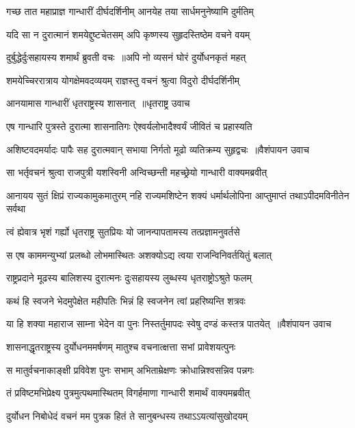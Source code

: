 \twolineshloka
{गच्छ तात महाप्राज्ञ गान्धारीं दीर्घदर्शिनीम्}
{आनयेह तया सार्धमनुनेष्यामि दुर्मतिम्}


\twolineshloka
{यदि सा न दुरात्मानं शमयेद्दुष्टचेतसम्}
{अपि कृष्णस्य सुहृदस्तिष्ठेम वचने वयम्}


\twolineshloka
{दुर्बुद्धेर्दुःसहायस्य शमार्थं ब्रुवती वचः ॥अपि नो व्यसनं घोरं दुर्योधनकृतं महत्}
{}


\threelineshloka
{शमयेच्चिररात्राय योगक्षेमवदव्ययम्}
{राज्ञस्तु वचनं श्रुत्वा विदुरो दीर्घदर्शिनीम्}
{}


\twolineshloka
{आनयामास गान्धारीं धृतराष्ट्रस्य शासनात् ॥धृतराष्ट्र उवाच}
{}


\twolineshloka
{एष गान्धारि पुत्रस्ते दुरात्मा शासनातिगः}
{ऐश्वर्यलोभादैश्वर्यं जीवितं च प्रहास्यति}


\threelineshloka
{अशिष्टवदमर्यादः पापैः सह दुरात्मवान्}
{सभाया निर्गतो मूढो व्यतिक्रम्य सुहृद्वचः ॥वैशंपायन उवाच}
{}


\twolineshloka
{सा भर्तृवचनं श्रुत्वा राजपुत्री यशस्विनी}
{अन्विच्छन्ती महच्छ्रेयो गान्धारी वाक्यमब्रवीत्}


\threelineshloka
{आनायय सुतं क्षिप्रं राज्यकामुकमातुरम्}
{नहि राज्यमशिष्टेन शक्यं धर्मार्थलोपिना}
{आप्तुमाप्तं तथाऽपीदमविनीतेन सर्वथा}


\twolineshloka
{त्वं ह्येवात्र भृशं गर्ह्यो धृतराष्ट्र सुतप्रियः}
{यो जानन्पापतामस्य तत्प्रज्ञामनुवर्तसे}


\twolineshloka
{स एष काममन्युभ्यां प्रलब्धो लोभमास्थितः}
{अशक्योऽद्य त्वया राजन्विनिवर्तयितुं बलात्}


\twolineshloka
{राष्ट्रप्रदाने मूढस्य बालिशस्य दुरात्मनः}
{दुःसहायस्य लुब्धस्य धृतराष्ट्रोऽश्रुते फलम्}


\twolineshloka
{कथं हि स्वजने भेदमुपेक्षेत महीपतिः}
{भिन्नं हि स्वजनेन त्वां प्रहरिष्यन्ति शत्रवः}


\threelineshloka
{या हि शक्या महाराज साम्ना भेदेन वा पुनः}
{निस्तर्तुमापदः स्वेषु दण्डं कस्तत्र पातयेत् ॥वैशंपायन उवाच}
{}


\twolineshloka
{शासनाद्धृतराष्ट्रस्य दुर्योधनममर्षणम्}
{मातुश्च वचनात्क्षत्ता सभां प्रावेशयत्पुनः}


\twolineshloka
{स मातुर्वचनाकाङ्क्षी प्रविवेश पुनः सभाम्}
{अभिताम्रेक्षणः क्रोधान्निश्वसन्निव पन्नगः}


\twolineshloka
{तं प्रविष्टमभिप्रेक्ष्य पुत्रमुत्पथमास्थितम्}
{विगर्हमाणा गान्धारी शमार्थं वाक्यमब्रवीत्}


\twolineshloka
{दुर्योधन निबोधेदं वचनं मम पुत्रक}
{हितं ते सानुबन्धस्य तथाऽऽयत्यांसुखोदयम्}


